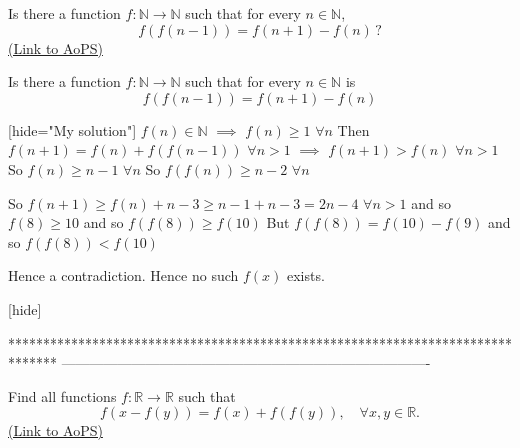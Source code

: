 \begin{problem}
	Is there a function $f: \mathbb N \rightarrow \mathbb N$ such that for every $n \in \mathbb N$, \[ f(f(n-1)) = f(n+1) - f(n) \, ?\]
	\flushright \href{https://artofproblemsolving.com/community/c6h84610}{(Link to AoPS)}
\end{problem}



\begin{solution}
	\begin{tcolorbox}Is there a function $ f: \mathbb N \rightarrow \mathbb N$ such that for every $ n \in \mathbb N$ is
\[ f(f(n - 1)) = f(n + 1) - f(n)
\]
\end{tcolorbox}
[hide="My solution"]
$ f(n)\in\mathbb N$ $ \implies$ $ f(n)\geq 1$ $ \forall n$
Then $ f(n+1)=f(n)+f(f(n-1))$ $ \forall n>1$ $ \implies$ $ f(n+1)>f(n)$ $ \forall n>1$
So $ f(n)\geq n-1$ $ \forall n$
So $ f(f(n))\geq n-2$ $ \forall n$

So $ f(n+1)\geq f(n)+n-3\geq n-1+n-3=2n-4$ $ \forall n>1$ and so $ f(8)\geq 10$ and so $ f(f(8))\geq f(10)$
But $ f(f(8))=f(10)-f(9)$ and so $ f(f(8))<f(10)$

Hence a contradiction.
Hence no such $ f(x)$ exists.

[\/hide]
\end{solution}
*******************************************************************************
-------------------------------------------------------------------------------

\begin{problem}
	Find all functions $ f : \mathbb{R} \to \mathbb{R}$ such that
\[f(x - f(y)) = f(x) + f(f(y)), \quad \forall x,y\in\mathbb R.\]
	\flushright \href{https://artofproblemsolving.com/community/c6h114884}{(Link to AoPS)}
\end{problem}



